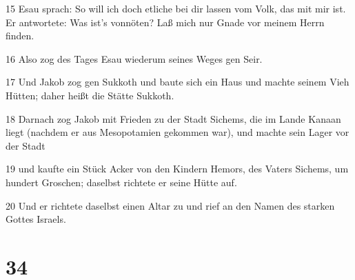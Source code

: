 \par 15 Esau sprach: So will ich doch etliche bei dir lassen vom Volk, das mit mir ist. Er antwortete: Was ist's vonnöten? Laß mich nur Gnade vor meinem Herrn finden.
\par 16 Also zog des Tages Esau wiederum seines Weges gen Seir.
\par 17 Und Jakob zog gen Sukkoth und baute sich ein Haus und machte seinem Vieh Hütten; daher heißt die Stätte Sukkoth.
\par 18 Darnach zog Jakob mit Frieden zu der Stadt Sichems, die im Lande Kanaan liegt (nachdem er aus Mesopotamien gekommen war), und machte sein Lager vor der Stadt
\par 19 und kaufte ein Stück Acker von den Kindern Hemors, des Vaters Sichems, um hundert Groschen; daselbst richtete er seine Hütte auf.
\par 20 Und er richtete daselbst einen Altar zu und rief an den Namen des starken Gottes Israels.

\chapter{34}

